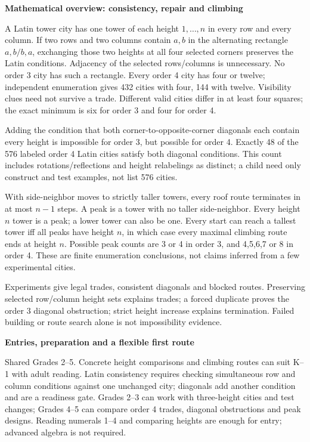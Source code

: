 \documentclass[11pt]{article}
\newcommand\lead[1]{\textbf{#1}\par}
\begin{document}
\lead{Mathematical overview: consistency, repair and climbing}
A Latin tower city has one tower of each height $1,\ldots,n $ in every row and every column. If two rows and two columns contain $a,b $ in the alternating rectangle $a,b/b,a $, exchanging those two heights at all four selected corners preserves the Latin conditions. Adjacency of the selected rows/columns is unnecessary. No order 3 city has such a rectangle. Every order 4 city has four or twelve; independent enumeration gives 432 cities with four, 144 with twelve. Visibility clues need not survive a trade. Different valid cities differ in at least four squares; the exact minimum is six for order 3 and four for order 4.

Adding the condition that both corner-to-opposite-corner diagonals each contain every height is impossible for order 3, but possible for order 4. Exactly 48 of the 576 labeled order 4 Latin cities satisfy both diagonal conditions. This count includes rotations/reflections and height relabelings as distinct; a child need only construct and test examples, not list 576 cities.

With side-neighbor moves to strictly taller towers, every roof route terminates in at most $n-1$ steps. A peak is a tower with no taller side-neighbor. Every height $n $ tower is a peak; a lower tower can also be one. Every start can reach a tallest tower iff all peaks have height $n $, in which case every maximal climbing route ends at height $n $. Possible peak counts are 3 or 4 in order 3, and 4,5,6,7 or 8 in order 4. These are finite enumeration conclusions, not claims inferred from a few experimental cities.

Experiments give legal trades, consistent diagonals and blocked routes. Preserving selected row/column height sets explains trades; a forced duplicate proves the order 3 diagonal obstruction; strict height increase explains termination. Failed building or route search alone is not impossibility evidence.

\lead{Entries, preparation and a flexible first route}
Shared Grades 2--5. Concrete height comparisons and climbing routes can suit K--1 with adult reading. Latin consistency requires checking simultaneous row and column conditions against one unchanged city; diagonals add another condition and are a readiness gate. Grades 2--3 can work with three-height cities and test changes; Grades 4--5 can compare order 4 trades, diagonal obstructions and peak designs. Reading numerals 1--4 and comparing heights are enough for entry; advanced algebra is not required.
\end{document}
